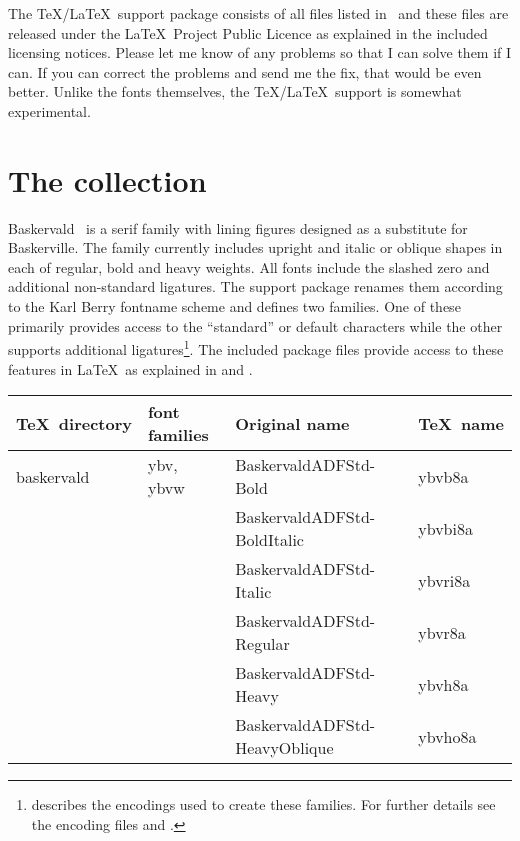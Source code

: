 \documentclass[11pt,british]{article}
\begin{document}
The \TeX/\LaTeX\ support package consists of all files listed in \ and these files are released under the \LaTeX\ Project Public Licence as explained in the included licensing notices. Please let me know of any problems so that I can solve them if I can. If you can correct the problems and send me the fix, that would be even better. Unlike the fonts themselves, the \TeX/\LaTeX\ support is somewhat experimental.

\section{The collection}

Baskervald \adf\ is a serif family with lining figures designed as a substitute for Baskerville. The family currently includes upright and italic or oblique shapes in each of regular, bold and heavy weights. All fonts include the slashed zero and additional non-standard ligatures. The support package renames them according to the Karl Berry fontname scheme and defines two families. One of these primarily provides access to the ``standard'' or default characters while the other supports additional ligatures\footnote{ describes the encodings used to create these families. For further details see the encoding files  and .}. The included package files provide access to these features in \LaTeX\ as explained in  and .

\clearpage

\begin{longtable}{llll}
	\toprule
	\textbf{\TeX\ directory}	&	\textbf{font families}	&	\textbf{Original name}	& \textbf{\TeX\ name}\\\midrule\endhead
		\bottomrule\endfoot
	baskervald		& ybv, ybvw	&	BaskervaldADFStd-Bold						&	ybvb8a\\
						& 							&	BaskervaldADFStd-BoldItalic				&	ybvbi8a\\
						&							&	BaskervaldADFStd-Italic						&	ybvri8a\\
						&							&	BaskervaldADFStd-Regular					&	ybvr8a\\
						&							&	BaskervaldADFStd-Heavy						&	ybvh8a\\
						&							&	BaskervaldADFStd-HeavyOblique		&	ybvho8a\\

\end{longtable}
\end{document}
